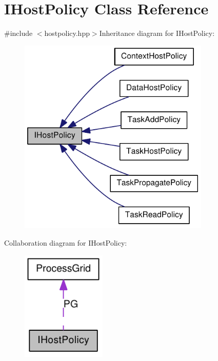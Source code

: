 \hypertarget{class_i_host_policy}{
\section{IHostPolicy Class Reference}
\label{class_i_host_policy}
}


{\ttfamily \#include $<$hostpolicy.hpp$>$}Inheritance diagram for IHostPolicy:\nopagebreak
\begin{figure}[H]
\begin{center}
\leavevmode
\includegraphics[width=258pt]{class_i_host_policy__inherit__graph}
\end{center}
\end{figure}
Collaboration diagram for IHostPolicy:\nopagebreak
\begin{figure}[H]
\begin{center}
\leavevmode
\includegraphics[width=114pt]{class_i_host_policy__coll__graph}
\end{center}
\end{figure}
